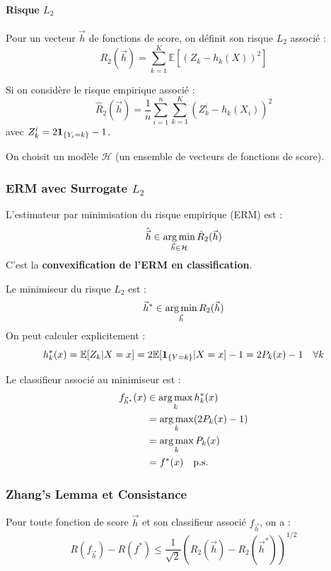 \paragraph{Risque $L_2$}

Pour un vecteur $\vec{h}$ de fonctions de score, on définit son risque $L_2$ associé :
\[
R_2(\vec{h}) = \sum_{k=1}^K \mathbb{E}\left[ (Z_k - h_k(X))^2 \right]
\]

Si on considère le risque empirique associé :
\[
\hat{R}_2(\vec{h}) = \frac{1}{n} \sum_{i=1}^n \sum_{k=1}^K (Z_k^i - h_k(X_i))^2
\]
avec $Z_k^i = 2\mathbf{1}_{\{Y_i = k\}} - 1$.

On choisit un modèle $\mathcal{H}$ (un ensemble de vecteurs de fonctions de score).

\subsubsection{ERM avec Surrogate $L_2$}

L'estimateur par minimisation du risque empirique (ERM) est :
\[
\hat{\vec{h}} \in \operatorname*{arg\,min}_{\vec{h} \in \mathcal{H}} \hat{R}_2(\vec{h})
\]
C'est la \textbf{convexification de l'ERM en classification}.

\begin{remarque}
Le minimiseur du risque $L_2$ est :
\[
\vec{h}^* \in \operatorname*{arg\,min}_{\vec{h}} R_2(\vec{h})
\]
On peut calculer explicitement :
\[
h_k^*(x) = \mathbb{E}[Z_k | X=x] = 2\mathbb{E}[\mathbf{1}_{\{Y=k\}} | X=x] - 1 = 2P_k(x) - 1 \quad \forall k
\]
\end{remarque}

Le classifieur associé au minimiseur est :
\begin{align*}
f_{\vec{h}^*}(x) &\in \operatorname*{arg\,max}_k h_k^*(x) \\
&= \operatorname*{arg\,max}_k (2P_k(x) - 1) \\
&= \operatorname*{arg\,max}_k P_k(x) \\
&= f^*(x) \quad \text{p.s.}
\end{align*}

\subsubsection{Zhang's Lemma et Consistance}

\begin{theoreme}
Pour toute fonction de score $\vec{h}$ et son classifieur associé $f_{\vec{h}}$, on a :
\[
R(f_{\vec{h}}) - R(f^*) \le \frac{1}{\sqrt{2}} \left( R_2(\vec{h}) - R_2(\vec{h}^*) \right)^{1/2}
\]
\end{theoreme}

